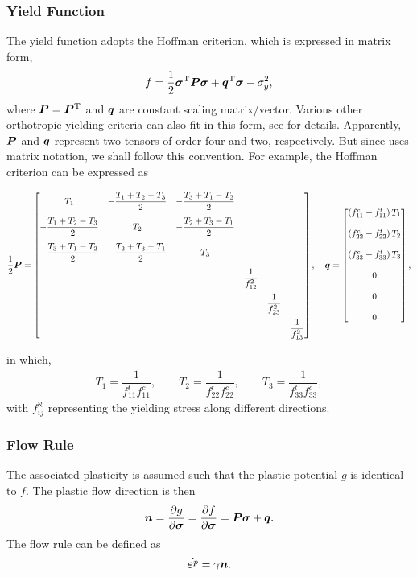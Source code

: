 \subsubsection{Yield Function}
The yield function adopts the Hoffman criterion, which is expressed in matrix form,
\begin{gather}
f=\dfrac{1}{2}\bm{\sigma}^{\mathrm{T}}\bm{P}\bm{\sigma}+\bm{q}^{\mathrm{T}}\bm{\sigma}-\sigma_y^2,
\end{gather}
where $\bm{P}=\bm{P}^{\mathrm{T}}$ and $\bm{q}$ are constant scaling matrix/vector.
Various other orthotropic yielding criteria can also fit in this form, see \cite{Oller2003} for details.
Apparently, $\bm{P}$ and $\bm{q}$ represent two tensors of order four and two, respectively.
But since \cite{Oller2003} uses matrix notation, we shall follow this convention.
For example, the Hoffman criterion can be expressed as
\begin{tiny}
\begin{gather}\label{eq:hoffman_criterion}
\dfrac{1}{2}\bm{P}=\begin{bmatrix}
T_1&-\dfrac{T_1+T_2-T_3}{2}&-\dfrac{T_3+T_1-T_2}{2}&&&\\[4mm]
-\dfrac{T_1+T_2-T_3}{2}&T_2&-\dfrac{T_2+T_3-T_1}{2}&&&\\[4mm]
-\dfrac{T_3+T_1-T_2}{2}&-\dfrac{T_2+T_3-T_1}{2}&T_3&&&\\[4mm]
&&&\dfrac{1}{f_{12}^2}&&\\[4mm]
&&&&\dfrac{1}{f_{23}^2}&\\[4mm]
&&&&&\dfrac{1}{f_{13}^2}
\end{bmatrix},\quad
\bm{q}=\begin{bmatrix}
\left(f_{11}^c-f_{11}^t\right)T_1\\[4mm]
\left(f_{22}^c-f_{22}^t\right)T_2\\[4mm]
\left(f_{33}^c-f_{33}^t\right)T_3\\[4mm]
0\\[4mm]
0\\[4mm]
0
\end{bmatrix},
\end{gather}
\end{tiny}
in which,
\begin{gather}
T_1=\dfrac{1}{f_{11}^tf_{11}^c},\qquad
T_2=\dfrac{1}{f_{22}^tf_{22}^c},\qquad
T_3=\dfrac{1}{f_{33}^tf_{33}^c},
\end{gather}
with $f_{ij}^\aleph$ representing the yielding stress along different directions.
\subsubsection{Flow Rule}
The associated plasticity is assumed such that the plastic potential $g$ is identical to $f$. The plastic flow direction is then
\begin{gather}
\bm{n}=\dfrac{\partial{g}}{\partial{\bm{\sigma}}}=\dfrac{\partial{f}}{\partial{\bm{\sigma}}}=\bm{P}\bm{\sigma}+\bm{q}.
\end{gather}
The flow rule can be defined as
\begin{gather}
\dot{\bm{\varepsilon}^p}=\gamma\bm{n}.
\end{gather}
